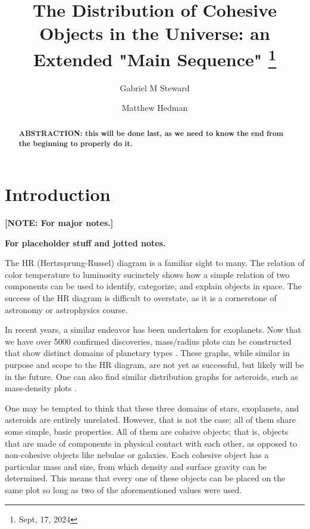 \documentclass[twocolumn,linenumbers]{aastex631}
\begin{document}
\title{The Distribution of Cohesive Objects in the Universe: an Extended "Main Sequence"
\footnote{Sept, 17, 2024}}

\author[0000-0002-8482-4669]{Gabriel M Steward}

\author{Matthew Hedman}

\begin{abstract}

\textbf{\color{red}ABSTRACTION: this will be done last, as we need to know the end from the beginning to properly do it.\color{black}}

\end{abstract}


\section{Introduction} \label{sec:intro}

\textbf{\color{red} [NOTE: For major notes.] \color{black}}

\textbf{\color{blue}For placeholder stuff and jotted notes. \color{black}}

The HR (Hertzsprung-Russel) diagram is a familiar sight to many. The relation of color temperature to luminosity sucinctely shows how a simple relation of two components can be used to identify, categorize, and explain objects in space. The success of the HR diagram is difficult to overstate, as it is a cornerstone of astronomy or astrophysics course. 

In recent years, a similar endeavor has been undertaken for exoplanets. Now that we have over 5000 confirmed discoveries, mass/radius plots can be constructed that show distinct domains of planetary types \citep{Chen2016, Muller2024}. These graphs, while similar in purpose and scope to the HR diagram, are not yet as successful, but likely will be in the future. One can also find similar distribution graphs for asteroids, such as mass-density plots \citep{Carry2012}. 

One may be tempted to think that these three domains of stars, exoplanets, and asteroids are entirely unrelated. However, that is not the case; all of them share some simple, basic properties. All of them are cohsive objects; that is, objects that are made of components in physical contact with each other, as opposed to non-cohesive objects like nebulae or galaxies. Each cohesive object has a particular mass and size, from which density and surface gravity can be determined. This means that every one of these objects can be placed on the same plot so long as two of the aforementioned values were used. 
\end{document}
